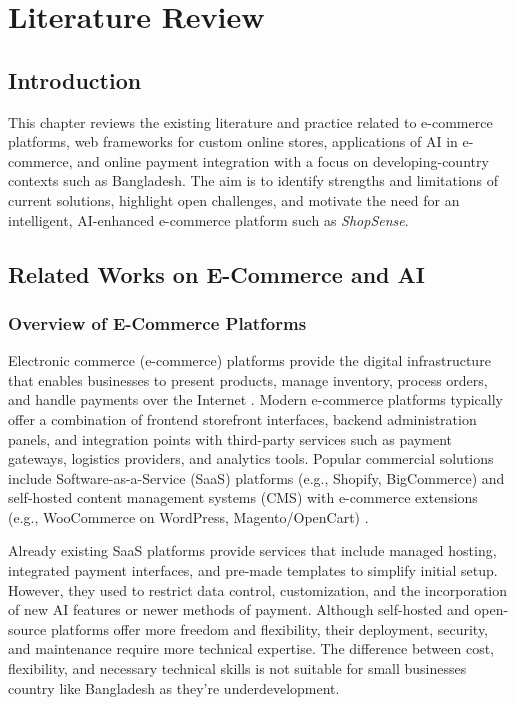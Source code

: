 \chapter{Literature Review}

\section{Introduction}
This chapter reviews the existing literature and practice related to e-commerce platforms, web frameworks for custom online stores, applications of AI in e-commerce, and online payment integration with a focus on developing-country contexts such as Bangladesh.  The aim is to identify strengths and limitations of current solutions, highlight open challenges, and motivate the need for an intelligent, AI-enhanced e-commerce platform such as \textit{ShopSense}.

\section{Related Works on E\texorpdfstring{-}{-}Commerce and AI}

\subsection{Overview of E\texorpdfstring{-}{-}Commerce Platforms}
Electronic commerce (e-commerce) platforms provide the digital infrastructure that enables businesses to present products, manage inventory, process orders, and handle payments over the Internet \cite{laudon2021ecommerce}.  Modern e-commerce platforms typically offer a combination of frontend storefront interfaces, backend administration panels, and integration points with third-party services such as payment gateways, logistics providers, and analytics tools.  Popular commercial solutions include Software-as-a-Service (SaaS) platforms (e.g., Shopify, BigCommerce) and self-hosted content management systems (CMS) with e-commerce extensions (e.g., WooCommerce on WordPress, Magento/OpenCart) \cite{laudon2021ecommerce}. 

Already existing SaaS platforms provide services that include managed hosting, integrated payment interfaces, and pre-made templates to simplify initial setup. However, they used to restrict data control, customization, and the incorporation of new AI features or newer methods of payment. Although self-hosted and open-source platforms offer more freedom and flexibility, their deployment, security, and maintenance require more technical expertise. The difference between cost, flexibility, and necessary technical skills is not suitable for small  businesses country like Bangladesh as they're underdevelopment.

